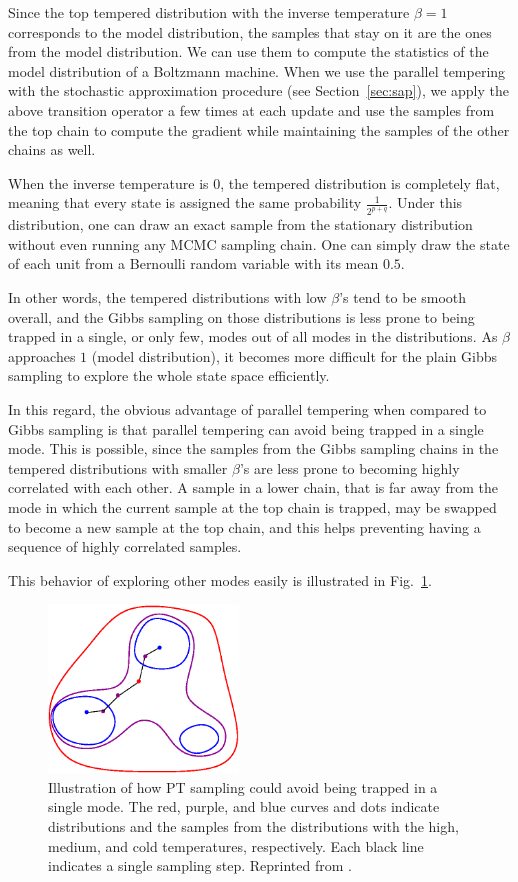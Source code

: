 \documentclass[dissertation,nocontribution,draft*]{aaltoseries}
\begin{document}
Since the top tempered distribution with the inverse
temperature $\beta=1$ corresponds to the model distribution,
the samples that stay on it are the ones from the model
distribution. We can use them to compute the statistics of
the model distribution of a Boltzmann machine. When we use
the parallel tempering with the stochastic approximation
procedure (see Section~\ref{sec:sap}), we apply the above
transition operator a few times at each update and use the
samples from the top chain to compute the gradient while
maintaining the samples of the other chains as well.

When the inverse temperature is $0$, the tempered
distribution is completely flat, meaning that every state is
assigned the same probability $\frac{1}{2^{p+q}}$. Under
this distribution, one can draw an exact sample from the
stationary distribution without even running any MCMC
sampling chain. One can simply draw the state of each unit
from a Bernoulli random variable with its mean $0.5$. 

In other words, the tempered distributions with low
$\beta$'s tend to be smooth overall, and the Gibbs sampling
on those distributions is less prone to being trapped in a
single, or only few, modes out of all modes in the
distributions. As $\beta$ approaches $1$ (model
distribution), it becomes more difficult for the plain Gibbs
sampling to explore the whole state space efficiently.

In this regard, the obvious advantage of parallel
tempering when compared to Gibbs sampling is that 
parallel tempering can avoid being trapped in a single mode.
This is possible, since the samples from the Gibbs sampling
chains in the tempered distributions with smaller $\beta$'s
are less prone to becoming highly correlated with each other.
A sample in a lower chain, that is far away from the mode
in which the current sample at the top chain is trapped, may be
swapped to become a new sample at the top chain, and this
helps preventing having a sequence of highly correlated
samples. 

This behavior of exploring other modes easily is illustrated
in Fig.~\ref{fig:pt_escape}.

\begin{figure}[t]
    \centering
    \includegraphics[width=0.45\textwidth]{figures/pt.eps}
    \caption{Illustration of how PT sampling could avoid
    being trapped in a single mode. The red, purple, and
    blue curves and dots indicate distributions and the
    samples from the distributions with the high, medium,
    and cold temperatures, respectively. Each black line
    indicates a single sampling step. Reprinted from
    \citep{Cho2011t}.}
    \label{fig:pt_escape}
\end{figure}
\end{document}

